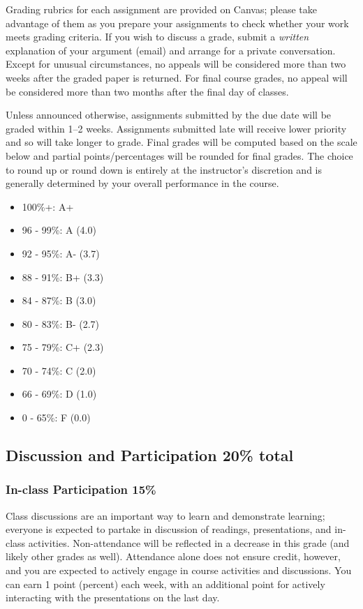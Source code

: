 \documentclass[11pt]{article}
\begin{document}
Grading rubrics for each assignment are provided on Canvas; please take advantage of them as you prepare your assignments to check whether your work meets grading criteria.
If you wish to discuss a grade, submit a \textit{written} explanation of your
argument (email) and arrange for a private conversation. 
Except for unusual circumstances, no appeals will be considered more than two weeks after the graded paper is
returned. For final course grades, no appeal will be considered more
than two months after the final day of classes.

Unless announced otherwise, assignments submitted by the due date will be graded within 1--2 weeks.
Assignments submitted late will receive lower priority and so will take longer to grade.
Final grades will be computed based on the scale below and partial points/percentages will be rounded for final grades.
The choice to round up or round down is entirely at the instructor's discretion and is generally determined by your overall performance in the course.

\vspace{0.1in}
\begin{itemize}[nolistsep]
	\item[] 100\%+:		 A+
	\item[] 96 - 99\%:   A   (4.0)
	\item[] 92 - 95\%:   A-   (3.7)
	\item[] 88 - 91\%:   B+  (3.3)
	\item[] 84 - 87\%:   B  (3.0)
	\item[] 80 - 83\%:   B-  (2.7)
	\item[] 75 - 79\%:   C+  (2.3)
	\item[] 70 - 74\%:   C  (2.0)
	\item[] 66 - 69\%:   D  (1.0)
	\item[] 0 - 65\%:    F (0.0)
\end{itemize}

\subsection{Discussion and Participation   20\% total}

\subsubsection{In-class Participation    15\%}
Class discussions are an important way to learn and demonstrate learning; everyone is expected to partake in discussion of readings, presentations, and in-class activities.
Non-attendance will be reflected in a decrease in this grade (and likely other grades as well).
Attendance alone does not ensure credit, however, and you are expected to actively engage in course activities and discussions.
You can earn 1 point (percent) each week, with an additional point for actively interacting with the presentations on the last day.
\end{document}
